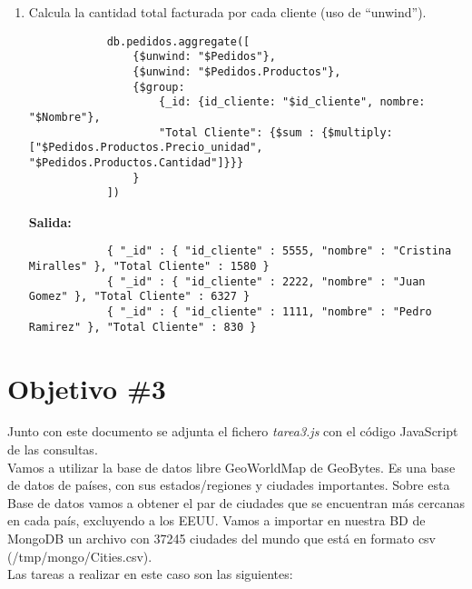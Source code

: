 \begin{enumerate}
	\item Calcula la cantidad total facturada por cada cliente (uso de “unwind”).
		\begin{lstlisting}
			db.pedidos.aggregate([
				{$unwind: "$Pedidos"},
				{$unwind: "$Pedidos.Productos"},
				{$group: 
					{_id: {id_cliente: "$id_cliente", nombre: "$Nombre"},
					"Total Cliente": {$sum : {$multiply: ["$Pedidos.Productos.Precio_unidad", "$Pedidos.Productos.Cantidad"]}}}
				}
			])
		\end{lstlisting}
		\textbf{Salida:}
		\begin{lstlisting}
			{ "_id" : { "id_cliente" : 5555, "nombre" : "Cristina Miralles" }, "Total Cliente" : 1580 }
			{ "_id" : { "id_cliente" : 2222, "nombre" : "Juan Gomez" }, "Total Cliente" : 6327 }
			{ "_id" : { "id_cliente" : 1111, "nombre" : "Pedro Ramirez" }, "Total Cliente" : 830 }
		\end{lstlisting}
\end{enumerate}

\section{Objetivo \#3}

Junto con este documento se adjunta el fichero \textit{tarea3.js} con el código JavaScript de las consultas. \\

Vamos a utilizar la base de datos libre GeoWorldMap de GeoBytes. Es una base de datos de países, con sus estados/regiones y ciudades importantes. Sobre esta Base de datos vamos a obtener el par de ciudades que se encuentran más cercanas en cada país, excluyendo a los EEUU. Vamos a importar en nuestra BD de MongoDB un archivo con 37245 ciudades del mundo que está en formato csv (/tmp/mongo/Cities.csv). \\

Las tareas a realizar en este caso son las siguientes: \\

